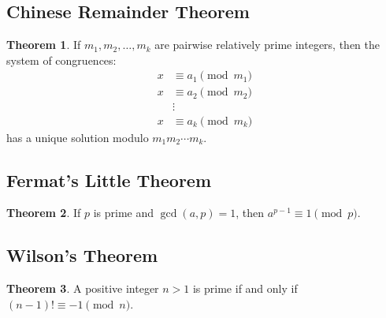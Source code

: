 \documentclass[11pt]{article}
\theoremstyle{definition}
\newtheorem{theorem}{Theorem}[section]
\begin{document}
\subsection{Chinese Remainder Theorem}
\begin{theorem}
If $m_1, m_2, \ldots, m_k$ are pairwise relatively prime integers, then the system of congruences:
\begin{align}
x &\equiv a_1 \pmod{m_1} \\
x &\equiv a_2 \pmod{m_2} \\
&\vdots \\
x &\equiv a_k \pmod{m_k}
\end{align}
has a unique solution modulo $m_1 m_2 \cdots m_k$.
\end{theorem}

\subsection{Fermat's Little Theorem}
\begin{theorem}
If $p$ is prime and $\gcd(a,p) = 1$, then $a^{p-1} \equiv 1 \pmod{p}$.
\end{theorem}

\subsection{Wilson's Theorem}
\begin{theorem}
A positive integer $n > 1$ is prime if and only if $(n-1)! \equiv -1 \pmod{n}$.
\end{theorem}
\end{document}
